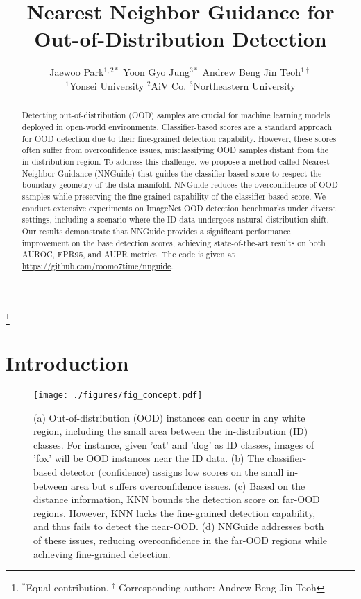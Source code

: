 \documentclass[10pt,twocolumn,letterpaper]{article}
\newcommand\blfootnote[1]{\begingroup
\renewcommand\thefootnote{}\footnote{#1}\addtocounter{footnote}{-1}\endgroup
}
\begin{document}
\title{Nearest Neighbor Guidance for Out-of-Distribution Detection}

\author{
Jaewoo Park$^{1,2*}$ \quad Yoon Gyo Jung$^{3*}$ \quad Andrew Beng Jin Teoh$^{1\dag}$ \\
$^1$Yonsei University \quad $^2$AiV Co. \quad $^3$Northeastern University
}


\maketitle
\ificcvfinal\thispagestyle{empty}\fi


\begin{abstract}
Detecting out-of-distribution (OOD) samples are crucial for machine learning models deployed in open-world environments. Classifier-based scores are a standard approach for OOD detection due to their fine-grained detection capability. However, these scores often suffer from overconfidence issues, misclassifying OOD samples distant from the in-distribution region. To address this challenge, we propose a method called Nearest Neighbor Guidance (NNGuide) that guides the classifier-based score to respect the boundary geometry of the data manifold. NNGuide reduces the overconfidence of OOD samples while preserving the fine-grained capability of the classifier-based score. We conduct extensive experiments on ImageNet OOD detection benchmarks under diverse settings, including a scenario where the ID data undergoes natural distribution shift. Our results demonstrate that NNGuide provides a significant performance improvement on the base detection scores, achieving state-of-the-art results on both AUROC, FPR95, and AUPR metrics. The code is given at \url{https://github.com/roomo7time/nnguide}.
\end{abstract}

\blfootnote{\noindent $^{*}$Equal contribution. $^{\dag}$ Corresponding author: Andrew Beng Jin Teoh}

\section{Introduction}
\label{sec:intro}


\begin{figure}[t]
\centering
\texttt{[image: ./figures/fig\_concept.pdf]}
\caption{
(a) Out-of-distribution (OOD) instances can occur in any white region, including the small area between the in-distribution (ID) classes. For instance, given 'cat' and 'dog' as ID classes, images of 'fox' will be OOD instances near the ID data. (b) The classifier-based detector (\ie confidence) assigns low scores on the small in-between area but suffers overconfidence issues. (c) Based on the distance information, KNN bounds the detection score on far-OOD regions. However, KNN lacks the fine-grained detection capability, and thus fails to detect the near-OOD. (d) NNGuide addresses both of these issues, reducing overconfidence in the far-OOD regions while achieving fine-grained detection.}
\label{fig:concept}
\end{figure}
\end{document}
